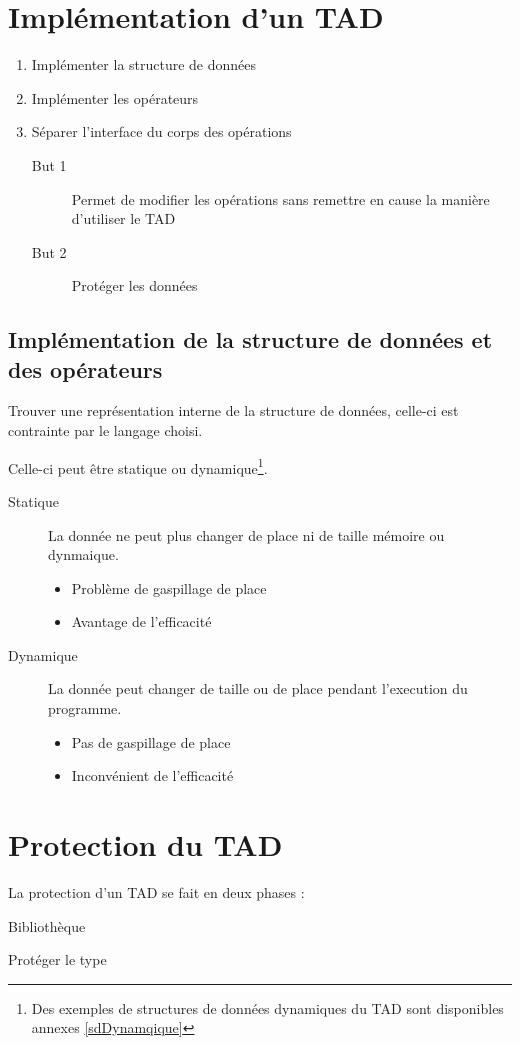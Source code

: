 \section{Implémentation d'un TAD}
\begin{enumerate}
	\item Implémenter la structure de données
	\item Implémenter les opérateurs
	\item Séparer l'interface du corps des opérations
		\begin{description}
			\item[But 1] Permet de modifier les opérations sans remettre en cause la manière d'utiliser le TAD
			\item[But 2] Protéger les données
		\end{description}
\end{enumerate}

\subsection{Implémentation de la structure de données et des opérateurs}
Trouver une représentation interne de la structure de données, celle-ci est contrainte par le langage choisi.

Celle-ci peut être statique ou dynamique\footnote{Des exemples de structures de données dynamiques du TAD sont disponibles annexes \ref{sdDynamqique}}. 
\begin{description}
	\item[Statique] La donnée ne peut plus changer de place ni de taille mémoire ou dynmaique.
		\begin{itemize}
			\item Problème de gaspillage de place
			\item Avantage de l'efficacité
		\end{itemize}
	\item[Dynamique] La donnée peut changer de taille ou de place pendant l'execution du programme.
		\begin{itemize}
			\item Pas de gaspillage de place
			\item Inconvénient de l'efficacité
		\end{itemize}
\end{description}

\section{Protection du TAD}
La protection d'un TAD se fait en deux phases : 
\begin{description}
	\item[séparer corps - interface] Bibliothèque 
	\item Protéger le type
\end{description}
